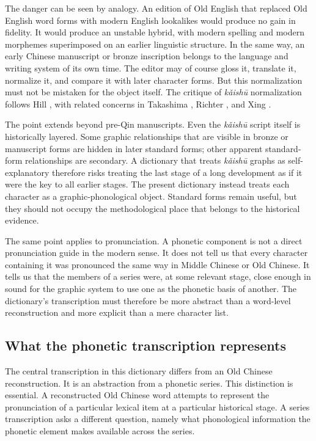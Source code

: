 The danger can be seen by analogy. An edition of Old English that replaced Old English word forms with modern English lookalikes would produce no gain in fidelity. It would produce an unstable hybrid, with modern spelling and modern morphemes superimposed on an earlier linguistic structure. In the same way, an early Chinese manuscript or bronze inscription belongs to the language and writing system of its own time. The editor may of course gloss it, translate it, normalize it, and compare it with later character forms. But this normalization must not be mistaken for the object itself. The critique of \emph{kǎishū} normalization follows Hill \parencite{hill-2015-transcription}, with related concerns in Takashima \parencite{takashima-2000}, Richter \parencite{richter-2003}, and Xing \parencite{xing-2005}.

The point extends beyond pre-Qin manuscripts. Even the \emph{kǎishū} script itself is historically layered. Some graphic relationships that are visible in bronze or manuscript forms are hidden in later standard forms; other apparent standard-form relationships are secondary. A dictionary that treats \emph{kǎishū} graphs as self-explanatory therefore risks treating the last stage of a long development as if it were the key to all earlier stages. The present dictionary instead treats each character as a graphic-phonological object. Standard forms remain useful, but they should not occupy the methodological place that belongs to the historical evidence.

The same point applies to pronunciation. A phonetic component is not a direct pronunciation guide in the modern sense. It does not tell us that every character containing it was pronounced the same way in Middle Chinese or Old Chinese. It tells us that the members of a series were, at some relevant stage, close enough in sound for the graphic system to use one as the phonetic basis of another. The dictionary's transcription must therefore be more abstract than a word-level reconstruction and more explicit than a mere character list.

\subsection*{What the phonetic transcription represents}

The central transcription in this dictionary differs from an Old Chinese reconstruction. It is an abstraction from a phonetic series. This distinction is essential. A reconstructed Old Chinese word attempts to represent the pronunciation of a particular lexical item at a particular historical stage. A series transcription asks a different question, namely what phonological information the phonetic element makes available across the series.

